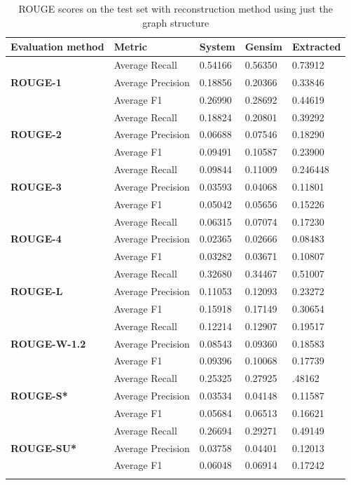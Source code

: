\begin{longtable}{| l | l | l | l | l |}
	\hline
	\textbf{Evaluation method}&\textbf{Metric}&\textbf{System}&\textbf{Gensim}&\textbf{Extracted}\\ \hline \hline
	\multirow{3}{*}{\textbf{ROUGE-1}}
		&Average Recall&0.54166&0.56350&0.73912 \\
		&Average Precision&0.18856&0.20366&0.33846 \\ 
		&Average F1&0.26990&0.28692&0.44619 \\ \hline \hline
	\multirow{3}{*}{\textbf{ROUGE-2}}
		&Average Recall&0.18824&0.20801&0.39292 \\
		&Average Precision&0.06688&0.07546&0.18290 \\
		&Average F1&0.09491&0.10587&0.23900 \\ \hline \hline
	\multirow{3}{*}{\textbf{ROUGE-3}}
		&Average Recall&0.09844&0.11009&0.246448 \\
		&Average Precision&0.03593&0.04068&0.11801 \\
		&Average F1&0.05042&0.05656&0.15226 \\ \hline \hline
	\multirow{3}{*}{\textbf{ROUGE-4}}
		&Average Recall&0.06315&0.07074&0.17230 \\
		&Average Precision&0.02365&0.02666&0.08483 \\
		&Average F1&0.03282&0.03671&0.10807 \\ \hline \hline
	\multirow{3}{*}{\textbf{ROUGE-L}}
		&Average Recall&0.32680&0.34467&0.51007 \\
		&Average Precision&0.11053&0.12093&0.23272 \\
		&Average F1&0.15918&0.17149&0.30654 \\ \hline \hline
	\multirow{3}{*}{\textbf{ROUGE-W-1.2}}
		&Average Recall&0.12214&0.12907&0.19517 \\
		&Average Precision&0.08543&0.09360&0.18583 \\
		&Average F1&0.09396&0.10068&0.17739 \\ \hline \hline
	\multirow{3}{*}{\textbf{ROUGE-S*}}
		&Average Recall&0.25325&0.27925&.48162 \\
		&Average Precision&0.03534&0.04148&0.11587 \\
		&Average F1&0.05684&0.06513&0.16621 \\ \hline \hline
	\multirow{3}{*}{\textbf{ROUGE-SU*}}
		&Average Recall&0.26694&0.29271&0.49149 \\
		&Average Precision&0.03758&0.04401&0.12013 \\
		&Average F1&0.06048&0.06914&0.17242 \\ \hline
	\caption{ROUGE scores on the test set with reconstruction method using just the graph structure}
\end{longtable}

